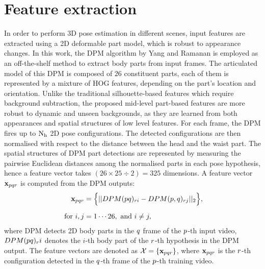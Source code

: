 \section{Feature extraction}
\label{sec/body/featureextraction} 

In order to perform 3D pose estimation in different scenes, input features are extracted using a 2D deformable part model, which is robust to appearance changes.  
In this work, the DPM algorithm by Yang and Ramanan \cite{Yang2011} is employed as an off-the-shelf method to extract body parts from input frames. 
The articulated model of this DPM is composed of $26$ constituent parts, each of them is represented by a mixture of HOG features, depending on the part's location and orientation. 
Unlike the traditional silhouette-based features which require background subtraction, the proposed mid-level part-based features are more robust to dynamic and unseen backgrounds, as they are learned from both appearances and spatial structures of low level features. 
For each frame, the DPM fires up to $\mathrm{N_{h}}$ 2D pose configurations.  
The detected configurations are then normalised with respect to the distance between the head and the waist part. 
The spatial structures of DPM part detections are represented by measuring the pairwise Euclidean distances among the normalised parts in each pose hypothesis, hence a feature vector takes $(26 \times 25 \div 2) = 325$ dimensions.
A feature vector $\mathbf{x}_{pqr}$ is computed from the DPM outputs:
\begin{equation}
	\label{eqn/body/feature} 
	\begin{aligned}
		\mathbf{x}_{pqr} & = \Big\{ || DPM(pq)_{r i} - DPM(p, q)_{r j} ||_{2} \Big\}, \\[2mm]
		\mbox{ for } i, j & = 1\cdots26, \mbox{ and } i \not= j,
	\end{aligned}
\end{equation}
where DPM detects 2D body parts in the $q$ frame of the $p$-th input video, $DPM(pq)_r i$ denotes the $i$-th body part of the $r$-th hypothesis in the DPM output. The feature vectors are denoted as $\mathcal{X} = \{\mathbf{x}_{pqr}\}$, where $\mathbf{x}_{pqr}$ is the $r$-th configuration detected in the $q$-th frame of the $p$-th training video. 


